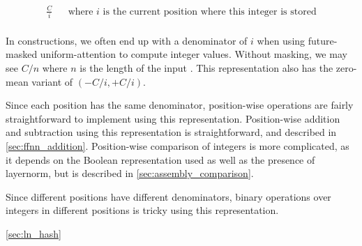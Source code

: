   \begin{align*}
    \frac{C}{i} & & \text{where $i$ is the current position where this integer is stored}\\
  \end{align*}

In constructions, we often end up with a denominator of $i$ when using future-masked uniform-attention to compute integer values.
Without masking, we may see $C/n$ where $n$ is the length of the input \cite{chiang+:icml2023}.
This representation also has the zero-mean variant of $(-C/i, +C/i)$.

Since each position has the same denominator, position-wise operations are fairly straightforward to implement using this representation. Position-wise addition and subtraction using this representation is straightforward, and described in \cref{sec:ffnn_addition}. Position-wise comparison of integers is more complicated, as it depends on the Boolean representation used as well as the presence of layernorm, but is described in \cref{sec:assembly_comparison}.

Since different positions have different denominators,  binary operations over integers in different positions is tricky using this representation.

\cref{sec:ln_hash}

